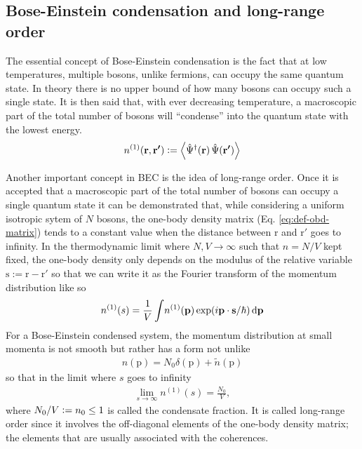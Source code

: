 \documentclass[12pt,a4paper]{book}
\renewcommand{\vec}[1]{\bm{\mathrm{#1}}}
\begin{document}
		\subsection{Bose-Einstein condensation and long-range order}
			The essential concept of Bose-Einstein condensation is the fact that at low temperatures, multiple bosons, unlike fermions, can occupy the same quantum state. In theory there is no upper bound of how many bosons can occupy such a single state. It is then said that, with ever decreasing temperature, a macroscopic part of the total number of bosons will ``condense'' into the quantum state with the lowest energy.\\
			
			\begin{align}
				n^{(1)}(\vec{r},\vec{r'}) \vcentcolon= \expectationvalue{\hat{\Psi}^\dagger(\vec{r})\,\hat{\Psi}(\vec{r'})}\label{eq:def-obd-matrix}
			\end{align}
			
			Another important concept in BEC is the idea of long-range order. Once it is accepted that a macroscopic part of the total number of bosons can occupy a single quantum state it can be demonstrated that, while considering a uniform isotropic sytem of $N$ bosons, the one-body density matrix (Eq. \ref{eq:def-obd-matrix}) tends to a constant value when the distance between $\vec{r}$ and $\vec{r}'$ goes to infinity. In the thermodynamic limit where $N,V\rightarrow\infty$ such that $n=N/V$ kept fixed, the one-body density only depends on the modulus of the relative variable $\vec{s}:=\vec{r}-\vec{r}'$ so that we can write it as the Fourier transform of the momentum distribution like so
			\begin{align}
				n^{(1)}(s) = \frac{1}{V}\int \! n^{(1)}\qty(\vec{p})\exp(i\vec{p}\cdot\vec{s}/\hbar)\,\mathrm{d}\vec{p}
			\end{align}
			For a Bose-Einstein condensed system, the momentum distribution at small momenta is not smooth but rather has a form not unlike
			\begin{align}
				n(\vec{p})=N_0\delta(\vec{p})+\tilde{n}(\vec{p})
			\end{align}
			so that in the limit where $s$ goes to infinity
			\begin{align}
				\lim_{s\rightarrow\infty}n^{(1)}(s)=\frac{N_0}{V},
			\end{align}
			where $N_0/V \vcentcolon= n_0\leq 1$ is called the condensate fraction. It is called long-range order since it involves the off-diagonal elements of the one-body density matrix; the elements that are usually associated with the coherences.\\
			
\end{document}
